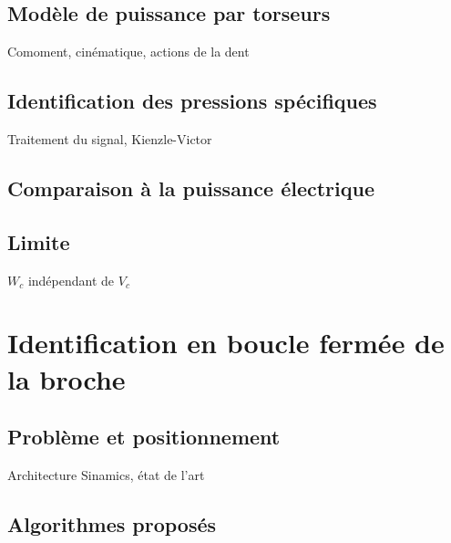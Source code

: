 \documentclass{style/presentation}
\begin{document}
\subsection{Modèle de puissance par torseurs}

\begin{frame}
    Comoment, cinématique, actions de la dent
\end{frame}

\subsection{Identification des pressions spécifiques}

\begin{frame}
    Traitement du signal, Kienzle-Victor
\end{frame}

\subsection{Comparaison à la puissance électrique}

\begin{frame}

\end{frame}

\subsection{Limite}

\begin{frame}
    $W_c$ indépendant de $V_c$
\end{frame}

\section{Identification en boucle fermée de la broche}

\subsection{Problème et positionnement}

\begin{frame}
    Architecture Sinamics, état de l'art
\end{frame}

\subsection{Algorithmes proposés}
\end{document}
